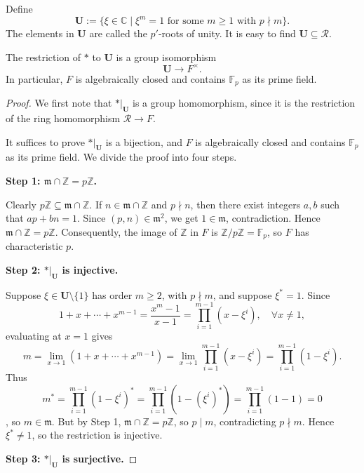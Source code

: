 Define
\[
\mathbf{U} := \{ \xi \in \mathbb{C} \mid \xi^m = 1 \text{ for some } m \ge 1 \text{ with } p \nmid m \}.
\]
The elements in $\mathbf{U}$ are called the \(p'\)-roots of unity. It is easy to find \(\mathbf{U} \subseteq \mathcal{R}\).


\begin{lemma}\label{lem:Teichmuller}
The restriction of \(*\) to \(\mathbf{U}\) is a group isomorphism
\[
\mathbf{U} \longrightarrow F^\times.
\]
In particular, \(F\) is algebraically closed and contains \(\mathbb{F}_p\) as its prime field.
\end{lemma}

\begin{proof}
We first note that \(*|_{\mathbf{U}}\) is a group homomorphism, since it is the restriction of the ring homomorphism \(\mathcal{R} \to F\).

It suffices to prove  \(*|_{\mathbf{U}}\) is a bijection, and \(F\) is algebraically closed and contains \(\mathbb{F}_p\) as its prime field.
We divide the proof into four steps.

\medskip
\noindent\textbf{Step 1: \(\mathfrak{m} \cap \mathbb{Z} = p\mathbb{Z}\).}

Clearly \(p\mathbb{Z} \subseteq \mathfrak{m} \cap \mathbb{Z}\). If \(n \in \mathfrak{m} \cap \mathbb{Z}\) and \(p \nmid n\), then there exist integers \(a, b\) such that \(ap + bn = 1\). Since \((p, n) \in \mathfrak{m}^2\), we get \(1 \in \mathfrak{m}\), contradiction. Hence \(\mathfrak{m} \cap \mathbb{Z} = p\mathbb{Z}\). Consequently, the image of \(\mathbb{Z}\) in \(F\) is \(\mathbb{Z}/p\mathbb{Z} = \mathbb{F}_p\), so \(F\) has characteristic \(p\).

\medskip
\noindent\textbf{Step 2: \(*|_{\mathbf{U}}\) is injective.}

Suppose \(\xi \in \mathbf{U}\setminus\{1\}\) has order \(m\ge 2\), with \(p \nmid m\), and suppose \(\xi^* = 1\). Since
\[
1 + x + \cdots + x^{m-1} = \frac{x^m - 1}{x - 1} = \prod_{i=1}^{m-1} (x - \xi^i),\quad\forall x\neq1,
\]
evaluating at \(x = 1\) gives
\[
m = \lim_{x \to 1} (1 + x + \cdots + x^{m-1}) 
  = \lim_{x \to 1} \prod_{i=1}^{m-1} (x - \xi^i) 
  = \prod_{i=1}^{m-1} (1 - \xi^i).
\]
Thus \[m ^*
  = \prod_{i=1}^{m-1} (1 - \xi^i)^* =\prod_{i=1}^{m-1} (1 - (\xi^i)^*) = \prod_{i=1}^{m-1} (1 - 1 )= 0\] , so \(m \in \mathfrak{m}\). But by Step 1, \(\mathfrak{m} \cap \mathbb{Z} = p\mathbb{Z}\), so \(p \mid m\), contradicting \(p \nmid m\). Hence \(\xi^* \neq 1\), so the restriction is injective.

\medskip
\noindent\textbf{Step 3: \(*|_{\mathbf{U}}\) is surjective.}


\end{proof}
